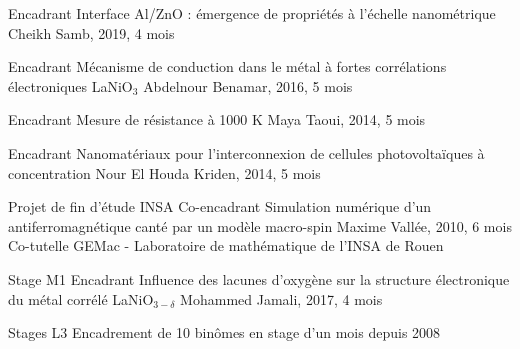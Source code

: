 \cventry
	{}
	{Encadrant}
	{Interface Al/ZnO : émergence de propriétés à l'échelle nanométrique}
	{Cheikh Samb, 2019, 4 mois}	
	{}{}
	
\cventry
	{}
	{Encadrant}
	{Mécanisme de conduction dans le métal à fortes corrélations électroniques LaNiO$_3$}
	{Abdelnour Benamar, 2016, 5 mois}	
	{}{}

\cventry
	{}
	{Encadrant}
	{Mesure de résistance à 1000 K}
	{Maya Taoui, 2014, 5 mois}	
	{}{}

\cventry
	{}
	{Encadrant}
	{Nanomatériaux pour l'interconnexion de cellules photovoltaïques à concentration}
	{Nour El Houda Kriden, 2014, 5 mois}
	{}{}
	
\cventry
	{Projet de fin d'étude INSA}
	{Co-encadrant}
	{Simulation numérique d'un antiferromagnétique canté par un modèle macro-spin}
	{Maxime Vallée, 2010, 6 mois}
	{Co-tutelle GEMac - Laboratoire de mathématique de l'INSA de Rouen}{}
	
\cventry
	{Stage M1}
	{Encadrant}
	{Influence des lacunes d'oxygène sur la structure électronique du métal corrélé
	LaNiO$_{3-\delta}$}
	{Mohammed Jamali, 2017, 4 mois}{}{}
	
\cventry
	{Stages L3}
	{Encadrement de 10 binômes en stage d'un mois depuis 2008}
	{}
	{}	
	{}{}

\iffalse
\cventry
	{Stages L3}
	{}
	{"Oxytronique : de l'expérience à la médiation scientifique"}
	{2015, 1 mois}	
	{}{}

\cventry
	{}
	{}
	{"Propriétés magnétiques de nanoparticules magnétiques fonctionnalisées"}
	{2013, 1 mois}	
	{}{}

\cventry
	{}
	{}
	{"Résolution numérique de l'équation de la chaleur"}
	{2011, 1 mois}	
	{}{}
	
\cventry
	{}
	{}
	{"Protocole d'utilisation du Physical Properties Measurement System"}
	{2010, 1 mois}	
	{}{}

\cventry
	{}
	{}
	{"Protocole d'utilisation d'un bâti de pulvérisation cathodique"}
	{2009, 1 mois}	
	{}{}	

\cventry
	{}
	{}
	{"Magnétométrie SQUID"}
	{2009, 1 mois}
	{}{}	

\cventry
	{}
	{}
	{"Conception et réalisation d'amplificateurs analogiques faible bruit"}
	{2008, 1 mois}
	{}{}		
	
\section{Contributions au département de physique}
\cventry
	{2012}
	{Médiation scientifique}{}
	{UVSQ}
	{Organisation d'une conférence sur \emph{Le boson de Higgs} par G. Cohen-Tannoudji}
	{}{}{}

\cventry
	{2010-2015}
	{Président de jury}
	{Semestre 2 de la première année de Licence, parcours Physique-Chimie}
	{}
	{}{}	
\fi